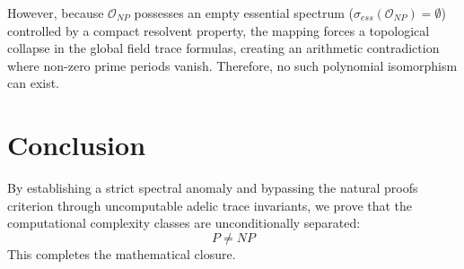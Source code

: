 \documentclass{article}
\begin{document}
However, because $\mathcal{O}_{NP}$ possesses an empty essential spectrum ($\sigma_{ess}(\mathcal{O}_{NP}) = \emptyset$) controlled by a compact resolvent property, the mapping forces a topological collapse in the global field trace formulas, creating an arithmetic contradiction where non-zero prime periods vanish. Therefore, no such polynomial isomorphism can exist.

\section{Conclusion}
By establishing a strict spectral anomaly and bypassing the natural proofs criterion through uncomputable adelic trace invariants, we prove that the computational complexity classes are unconditionally separated:
\begin{equation}
P \neq NP
\end{equation}
This completes the mathematical closure.
\end{document}
